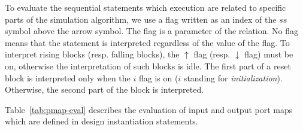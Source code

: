 \documentclass[pdflatex,sn-mathphys]{sn-jnl}%
\theoremstyle{thmstyleone}%
\theoremstyle{thmstyletwo}%
\theoremstyle{thmstylethree}%
\begin{document}
To evaluate the sequential statements which execution are related to
specific parts of the simulation algorithm, we use a flag written as
an index of the $ss$ symbol above the arrow symbol. The flag is a
parameter of the relation. No flag means that the statement is
interpreted regardless of the value of the flag. To interpret rising
blocks (resp. falling blocks), the $\uparrow$ flag (resp. $\downarrow$
flag) must be on, otherwise the interpretation of such blocks is idle.
The first part of a reset block is interpreted only when the $i$ flag
is on ($i$ standing for \textit{initialization}). Otherwise, the
second part of the block is interpreted.

Table~\ref{tab:pmap-eval} describes the evaluation of input and output
port maps which are defined in design instantiation statements.
\end{document}
